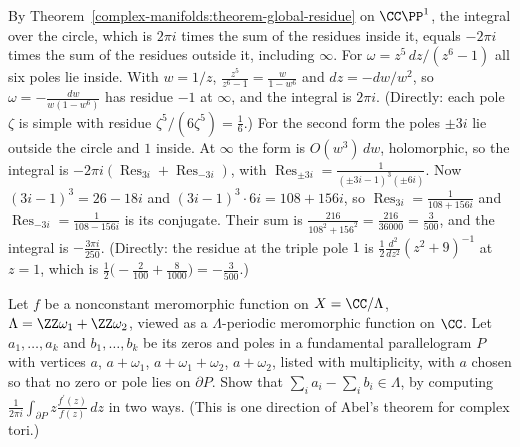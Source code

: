 \begin{solution}
By Theorem~\ref{complex-manifolds:theorem-global-residue} on $\CC\PP^1$, the integral over the circle, which is $2\pi i$ times the sum of the residues inside it, equals $-2\pi i$ times the sum of the residues
outside it, including $\infty$. For $\omega = z^5\,dz/(z^6 - 1)$ all six poles lie inside. With $w = 1/z$, $\frac{z^5}{z^6 - 1} = \frac{w}{1 - w^6}$ and $dz = -dw/w^2$, so $\omega = -\frac{dw}{w(1 - w^6)}$ has residue $-1$
at $\infty$, and the integral is $2\pi i$. (Directly: each pole $\zeta$ is simple with residue $\zeta^5/(6\zeta^5) = \frac16$.) For the second form the poles $\pm3i$ lie outside the circle and $1$ inside. At
$\infty$ the form is $O(w^3)\,dw$, holomorphic, so the integral is $-2\pi i(\operatorname{Res}_{3i} + \operatorname{Res}_{-3i})$, with
$\operatorname{Res}_{\pm3i} = \frac{1}{(\pm3i - 1)^3(\pm6i)}$. Now $(3i - 1)^3 = 26 - 18i$ and $(3i - 1)^3 \cdot 6i = 108 + 156i$, so $\operatorname{Res}_{3i} = \frac{1}{108 + 156i}$ and
$\operatorname{Res}_{-3i} = \frac{1}{108 - 156i}$ is its conjugate. Their sum is $\frac{216}{108^2 + 156^2} = \frac{216}{36000} = \frac{3}{500}$, and the integral is $-\frac{3\pi i}{250}$. (Directly: the
residue at the triple pole $1$ is $\frac12\frac{d^2}{dz^2}(z^2 + 9)^{-1}$ at $z = 1$, which is $\frac12\bigl(-\frac{2}{100} + \frac{8}{1000}\bigr) = -\frac{3}{500}$.)
\end{solution}

\begin{exercise}\label{complex-manifolds:exercise-abel-torus}
Let $f$ be a nonconstant meromorphic function on $X = \CC/\Lambda$, $\Lambda = \ZZ\omega_1 + \ZZ\omega_2$, viewed as a $\Lambda$-periodic meromorphic function on $\CC$. Let $a_1, \ldots, a_k$ and $b_1, \ldots, b_k$ be
its zeros and poles in a fundamental parallelogram $P$ with vertices $a$, $a + \omega_1$, $a + \omega_1 + \omega_2$, $a + \omega_2$, listed with multiplicity, with $a$ chosen so that no zero or pole lies on
$\partial P$. Show that $\sum_ia_i - \sum_ib_i \in \Lambda$, by computing $\frac{1}{2\pi i}\int_{\partial P}z\frac{f^{\prime}(z)}{f(z)}\,dz$ in two ways. (This is one direction of Abel's theorem for complex tori.)
\end{exercise}

